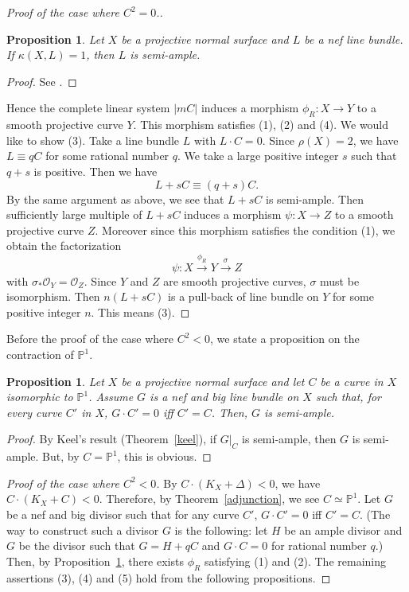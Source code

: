 \documentclass[12pt,twoside]{amsart}
\newtheorem{prop}[thm]{Proposition}
\theoremstyle{definition}
\newcommand{\pr}[1]{$\mathbb{P}^#1$}
\begin{document}
\begin{proof}[Proof of the case where $C^2=0$.]
\begin{prop}\label{kappa1}
Let $X$ be a projective normal surface and $L$ be a nef line bundle. 
If $\kappa(X, L)=1$, then $L$ is semi-ample.
\end{prop}

\begin{proof}
See \cite[Theorem~4.1]{Fujita}.
\end{proof}


Hence the complete linear system $|mC|$ induces a morphism 
$\phi_R:X \to Y$ to a smooth projective curve $Y$. 
This morphism satisfies (1), (2) and (4). 
We would like to show (3). 
Take a line bundle $L$ with $L\cdot C=0$. 
Since $\rho(X)=2$, 
we have $L\equiv qC$ for some rational number $q$. 
We take a large positive integer $s$ such that $q+s$ is positive. 
Then we have 
$$L+sC\equiv (q+s)C.$$
By the same argument as above, we see that $L+sC$ is semi-ample. 
Then sufficiently large multiple of $L+sC$ induces a morphism 
$\psi:X \to Z$ to a smooth projective curve $Z$. 
Moreover since this morphism satisfies the condition (1), 
we obtain the factorization 
$$\psi:X \overset{\phi_R}\to Y \overset{\sigma}\to Z$$
with $\sigma_* \mathcal O_Y=\mathcal O_Z$. 
Since $Y$ and $Z$ are smooth projective curves, 
$\sigma$ must be isomorphism. 
Then $n(L+sC)$ is a pull-back of line bundle on $Y$ 
for some positive integer $n$. 
This means (3). 
\end{proof}


Before the proof of the case where $C^2<0$, 
we state a proposition on the contraction of \pr1. 


\begin{prop}\label{p1cont}
Let $X$ be a projective normal surface and 
let $C$ be a curve in $X$ isomorphic to \pr1. 
Assume $G$ is a nef and big line bundle on $X$ 
such that, for every curve $C'$ in $X$, 
$G\cdot C'=0$ iff $C'=C$. 
Then, $G$ is semi-ample. 
\end{prop}

\begin{proof}
By Keel's result (Theorem~\ref{keel}), 
if $G|_C$ is semi-ample, then $G$ is semi-ample.
But, by $C=\mathbb P^1$, this is obvious. 
\end{proof}



\begin{proof}[Proof of the case where $C^2<0$]

By $C\cdot (K_X+\Delta)<0$, 
we have $C\cdot (K_X+C)<0$. 
Therefore, by Theorem~\ref{adjunction}, we see $C \simeq \mathbb{P}^1$. 
Let $G$ be a nef and big divisor such that 
for any curve $C'$, $G\cdot C'=0$ iff $C'=C$. 
(The way to construct such a divisor $G$ is the following: 
let $H$ be an ample divisor and $G$ be the divisor such that 
$G=H+qC$ and $G\cdot C=0$ for rational number $q$.) 
Then, by Proposition~\ref{p1cont}, there exists $\phi_R$ 
satisfying (1) and (2). 
The remaining assertions (3), (4) and (5) hold 
from the following propositions. 
\end{proof}
\end{document}

